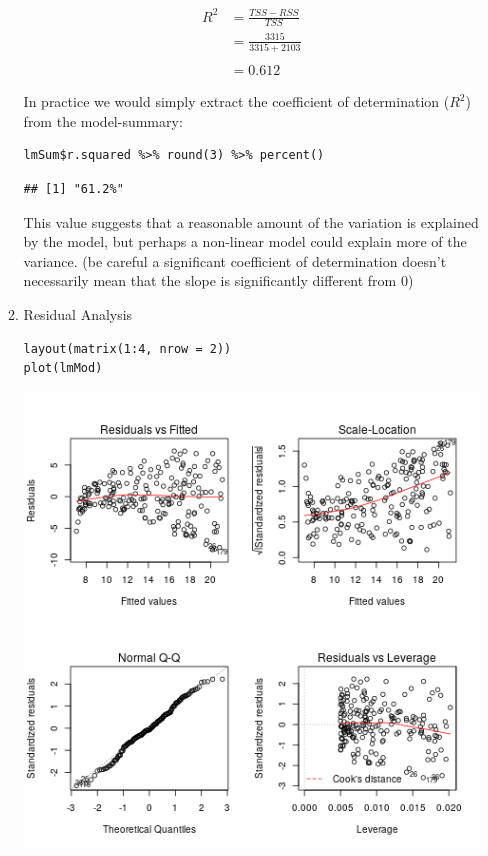 \documentclass[11pt]{article}
\begin{document}
\begin{enumerate}
\begin{enumerate}
\begin{align}
R^2 &= \frac{TSS-RSS}{TSS}\\
&= \frac{3315}{3315+2103}\\
\ \\
&= 0.612
\end{align}

In practice we would simply extract the coefficient of determination
(\(R^2\)) from the model-summary:

\begin{verbatim}
lmSum$r.squared %>% round(3) %>% percent()
\end{verbatim}

\begin{verbatim}
## [1] "61.2%"
\end{verbatim}

This value suggests that a reasonable amount of the variation is
explained by the model, but perhaps a non-linear model could explain
more of the variance. (be careful a significant coefficient of
determination doesn't necessarily mean that the slope is significantly
different from 0)
\item Residual Analysis
\label{sec:org14d95a7}
\begin{verbatim}
layout(matrix(1:4, nrow = 2))
plot(lmMod)
\end{verbatim}

\begin{center}
\includegraphics[width=.9\linewidth]{Intro02AdvPlotLinMod.png}
\end{center}


\end{enumerate}
\end{enumerate}
\end{document}

